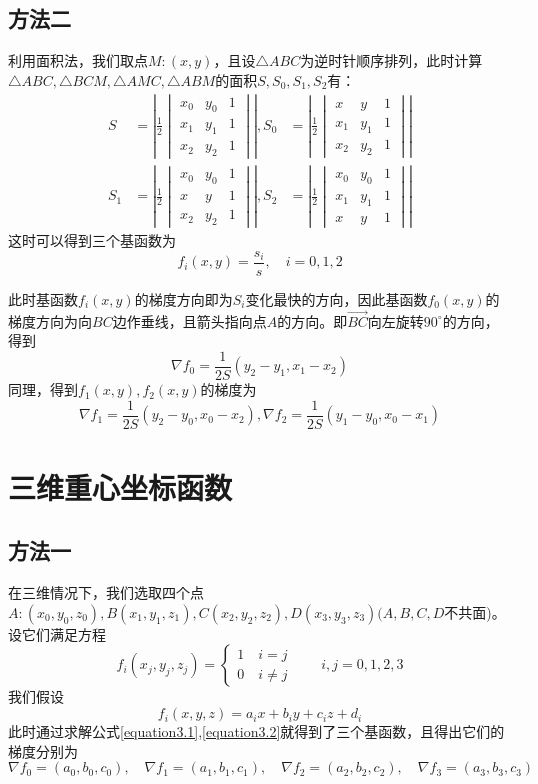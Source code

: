 \documentclass[12pt,a4paper]{article}
\begin{document}
\subsection{方法二}
利用面积法，我们取点$M:(x,y)$，且设$\triangle ABC$为逆时针顺序排列，此时计算$\triangle ABC,\triangle BCM,\triangle AMC,\triangle ABM$的面积$S,S_0,S_1,S_2$有：
\begin{equation*}\begin{aligned}
S&=\left| \frac{1}{2} \begin{vmatrix}
x_0&y_0&1\\x_1&y_1&1\\x_2&y_2&1\end{vmatrix}\right|,S_0&=\left| \frac{1}{2} \begin{vmatrix}
x&y&1\\x_1&y_1&1\\x_2&y_2&1\end{vmatrix}\right|\\
S_1&=\left| \frac{1}{2} \begin{vmatrix}
x_0&y_0&1\\x&y&1\\x_2&y_2&1\end{vmatrix}\right|,S_2&=\left| \frac{1}{2} \begin{vmatrix}
x_0&y_0&1\\x_1&y_1&1\\x&y&1\end{vmatrix}\right|
\end{aligned}
\end{equation*}
这时可以得到三个基函数为
\begin{equation}
f_i(x,y)=\frac{s_i}{s},\quad i=0,1,2
\end{equation}

此时基函数$f_i(x,y)$的梯度方向即为$S_i$变化最快的方向，因此基函数$f_0(x,y)$的梯度方向为向$BC$边作垂线，且箭头指向点$A$的方向。即$\overrightarrow {B C}$向左旋转$90^\circ$的方向，得到$$\nabla f_0=\frac{1}{2S}(y_2-y_1,x_1-x_2)$$
同理，得到$f_1(x,y),f_2(x,y)$的梯度为$$\nabla f_1=\frac{1}{2S}(y_2-y_0,x_0-x_2),\nabla f_2=\frac{1}{2S}(y_1-y_0,x_0-x_1)$$
\section{三维重心坐标函数}
\subsection{方法一}
在三维情况下，我们选取四个点$A:(x_0,y_0,z_0),B(x_1,y_1,z_1),C(x_2,y_2,z_2),D(x_3,y_3,z_3)(A,B,C,D$不共面)。设它们满足方程\begin{equation}
f_i(x_j,y_j,z_j)=\begin{cases}1 \quad i=j
\\ 0\quad i\neq j\end{cases}\qquad i,j=0,1,2,3
\label{equation3.1}
\end{equation}
我们假设\begin{equation}
f_i(x,y,z)=a_ix+b_iy+c_iz+d_i
\label{equation3.2}
\end{equation}
此时通过求解公式\ref{equation3.1},\ref{equation3.2}就得到了三个基函数，且得出它们的梯度分别为$$\nabla f_0=(a_0,b_0,c_0),\quad \nabla f_1=(a_1,b_1,c_1),\quad \nabla f_2=(a_2,b_2,c_2),\quad \nabla f_3=(a_3,b_3,c_3)$$
\end{document}
